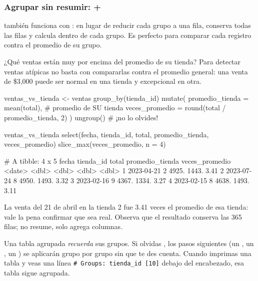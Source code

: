 \subsubsection{Agrupar sin resumir: \texorpdfstring{}{group\_by()} + \texorpdfstring{}{mutate()}}

 también funciona con : en lugar de
reducir cada grupo a una fila, conserva todas las filas y calcula dentro de
cada grupo. Es perfecto para comparar cada registro contra el promedio de su
grupo.

\begin{ejemplo}{¿Qué ventas están muy por encima del promedio de su tienda?}
Para detectar ventas atípicas no basta con compararlas contra el promedio
general: una venta de \$3,000 puede ser normal en una tienda y excepcional
en otra.
\end{ejemplo}

\begin{rcode}
ventas_vs_tienda <- ventas %
  group_by(tienda_id) %
  mutate(
    promedio_tienda = mean(total),              # promedio de SU tienda
    veces_promedio  = round(total / promedio_tienda, 2)
  ) %
  ungroup()                                     # ¡no lo olvides!

ventas_vs_tienda %
  select(fecha, tienda_id, total, promedio_tienda, veces_promedio) %
  slice_max(veces_promedio, n = 4)
\end{rcode}
\begin{rsalida}
# A tibble: 4 x 5
  fecha      tienda_id total promedio_tienda veces_promedio
  <date>         <dbl> <dbl>           <dbl>          <dbl>
1 2023-04-21         2 4925.           1443.           3.41
2 2023-07-24         8 4950.           1493.           3.32
3 2023-02-16         9 4367.           1334.           3.27
4 2023-02-15         8 4638.           1493.           3.11
\end{rsalida}

La venta del 21 de abril en la tienda 2 fue 3.41 veces el promedio de
esa tienda: vale la pena confirmar que sea real. Observa que el resultado
conserva las 365 filas;  no resume, solo agrega columnas.

\begin{advertencia}
Una tabla agrupada \emph{recuerda} sus grupos. Si olvidas
, los pasos siguientes (un , un
, un ) se aplicarán grupo por grupo
sin que te des cuenta. Cuando imprimas una tabla y veas una línea
\texttt{\# Groups: tienda\_id [10]} debajo del encabezado, esa tabla sigue
agrupada.
\end{advertencia}

